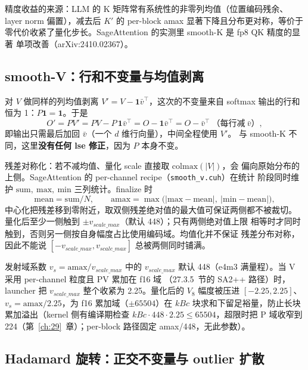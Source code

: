 精度收益的来源：LLM 的 K 矩阵常有系统性的非零列均值（位置编码残余、
layer norm 偏置），减去后 $K'$ 的 per-block amax 显著下降且分布更对称，等价于
零代价收紧了量化步长。SageAttention 的实测里 smooth-K 是 fp8 QK 精度的显著
单项改善（arXiv:2410.02367）。

\subsection{smooth-V：行和不变量与均值剥离}\label{sec:28-smv}

对 $V$ 做同样的列均值剥离 $V' = V - \mathbf{1}\bar v^{\top}$，这次的不变量来自
softmax 输出的行和恒为 1：$P\mathbf{1} = \mathbf{1}$。于是
\begin{equation}
  O' = P V' = P V - P\,\mathbf{1}\bar v^{\top} = O - \mathbf{1}\bar v^{\top}
      = O - \bar v^{\top}\ \text{（每行减}\ \bar v\text{）},
  \label{eq:28-smv-invariant}
\end{equation}
即输出只需最后加回 $\bar v$（一个 $d$ 维行向量），中间全程使用 $V'$。
与 smooth-K 不同，这里\textbf{没有任何 lse 修正}，因为 $P$ 本身不变。

残差对称化：若不减均值、量化 scale 直接取 $\mathrm{colmax}(|V|)$，会
偏向原始分布的上侧。SageAttention 的 per-channel recipe（\texttt{smooth\_v.cuh}）在统计
阶段同时维护 $\mathrm{sum},\ \mathrm{max},\ \mathrm{min}$ 三列统计。finalize 时
\begin{equation}
  \text{mean} = \mathrm{sum}/N,\qquad
  \mathrm{amax} = \max\!\big(|\mathrm{max}-\mathrm{mean}|,\ |\mathrm{min}-\mathrm{mean}|\big),
  \label{eq:28-smv-amax}
\end{equation}
中心化把残差移到零附近，取双侧残差绝对值的最大值可保证两侧都不被裁切。
量化后至少一侧触到 $\pm v_{scale\_max}$（默认 448）；只有两侧绝对值上限
相等时才同时触到，否则另一侧按自身幅度占比使用编码域。均值化并不保证
残差分布对称，因此不能说 $[-v_{scale\_max},v_{scale\_max}]$ 总被两侧同时铺满。

发射域系数 $v_s = \mathrm{amax}/v_{scale\_max}$ 中的 $v_{scale\_max}$ 默认
448（e4m3 满量程）。当 V 采用 per-channel 粒度且 PV 累加在 f16 域
（27.3.5~节的 SA2++ 路径）时，
launcher 把 $v_{scale\_max}$ 整个收紧为 2.25。量化后的 $V_8$ 幅度被压进
$[-2.25, 2.25]$、$v_s = \mathrm{amax}/2.25$，为 f16 累加域（$\pm 65504$）在
$kBc$ 块求和下留足裕量，防止长块累加溢出（kernel 侧有编译期检查
$kBc\cdot 448\cdot 2.25 \le 65504$，超限时把 P 域收窄到 224（第~\ref{ch:29}~章）；per-block 路径固定 amax/448，无此参数）。

\subsection{Hadamard 旋转：正交不变量与 outlier 扩散}\label{sec:28-wht}

